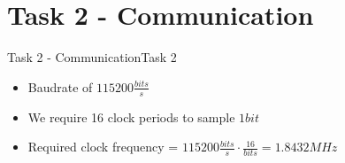 
\section{Task 2 - Communication}

\setcounter{task}{1}

\begin{frame}[fragile]{Task 2 - Communication}{Task 2}
  \begin{solution}
        \begin{itemize}
          \item Baudrate of $115200 \frac{bits}{s}$
          \item We require 16 clock periods to sample $1 bit$
          \item Required clock frequency = $115200 \frac{bits}{s} \cdot \frac{16}{bits} = 1.8432 MHz$
        \end{itemize}
  \end{solution}
\end{frame}

